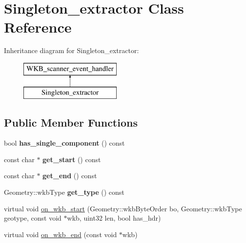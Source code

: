 \hypertarget{classSingleton__extractor}{}\section{Singleton\+\_\+extractor Class Reference}
\label{classSingleton__extractor}
Inheritance diagram for Singleton\+\_\+extractor\+:\begin{figure}[H]
\begin{center}
\leavevmode
\includegraphics[height=2.000000cm]{classSingleton__extractor}
\end{center}
\end{figure}
\subsection*{Public Member Functions}
\begin{DoxyCompactItemize}
\item 
\mbox{\label{classSingleton__extractor_aed453d9c87542f4f20480d2cb539e636}} 
bool {\bfseries has\+\_\+single\+\_\+component} () const
\item 
\mbox{\label{classSingleton__extractor_aff8df0db4b73a4add0812f73a237c981}} 
const char $\ast$ {\bfseries get\+\_\+start} () const
\item 
\mbox{\label{classSingleton__extractor_ad3b2a19765542fe0c8745f5db6e9634d}} 
const char $\ast$ {\bfseries get\+\_\+end} () const
\item 
\mbox{\label{classSingleton__extractor_a2ba1245313eb8488ddfb13156d6bd266}} 
Geometry\+::wkb\+Type {\bfseries get\+\_\+type} () const
\item 
virtual void \mbox{\hyperlink{classSingleton__extractor_a9a071750643d115773d3375e98a9c8c2}{on\+\_\+wkb\+\_\+start}} (Geometry\+::wkb\+Byte\+Order bo, Geometry\+::wkb\+Type geotype, const void $\ast$wkb, uint32 len, bool has\+\_\+hdr)
\item 
virtual void \mbox{\hyperlink{classSingleton__extractor_af504a10c6a45262fb75907677fce3b56}{on\+\_\+wkb\+\_\+end}} (const void $\ast$wkb)
\end{DoxyCompactItemize}
